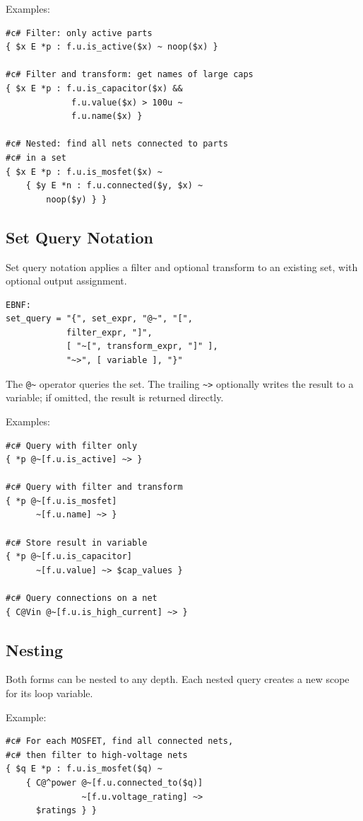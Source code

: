Examples:
\begin{verbatim}
#c# Filter: only active parts
{ $x E *p : f.u.is_active($x) ~ noop($x) }

#c# Filter and transform: get names of large caps
{ $x E *p : f.u.is_capacitor($x) && 
             f.u.value($x) > 100u ~ 
             f.u.name($x) }

#c# Nested: find all nets connected to parts 
#c# in a set
{ $x E *p : f.u.is_mosfet($x) ~ 
    { $y E *n : f.u.connected($y, $x) ~ 
        noop($y) } }
\end{verbatim}

\subsection{Set Query Notation}
Set query notation applies a filter and optional transform to an existing set, with optional output assignment.
\begin{verbatim}
EBNF:
set_query = "{", set_expr, "@~", "[", 
            filter_expr, "]", 
            [ "~[", transform_expr, "]" ],
            "~>", [ variable ], "}"
\end{verbatim}

The \texttt{@\~} operator queries the set. The trailing \texttt{\~{}>} optionally writes the result to a variable; if omitted, the result is returned directly.

Examples:
\begin{verbatim}
#c# Query with filter only
{ *p @~[f.u.is_active] ~> }

#c# Query with filter and transform
{ *p @~[f.u.is_mosfet] 
      ~[f.u.name] ~> }

#c# Store result in variable
{ *p @~[f.u.is_capacitor] 
      ~[f.u.value] ~> $cap_values }

#c# Query connections on a net
{ C@Vin @~[f.u.is_high_current] ~> }
\end{verbatim}

\subsection{Nesting}
Both forms can be nested to any depth. Each nested query creates a new scope for its loop variable.

Example:
\begin{verbatim}
#c# For each MOSFET, find all connected nets,
#c# then filter to high-voltage nets
{ $q E *p : f.u.is_mosfet($q) ~ 
    { C@^power @~[f.u.connected_to($q)] 
               ~[f.u.voltage_rating] ~> 
      $ratings } }
\end{verbatim}
